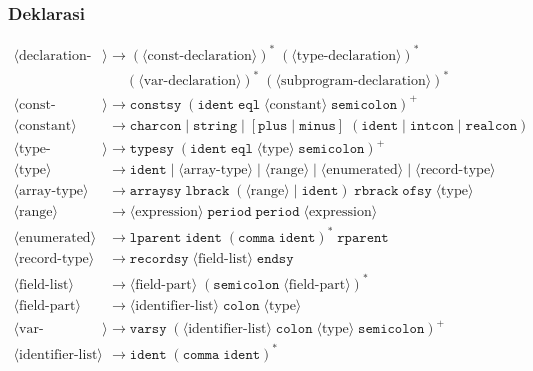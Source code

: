 \documentclass[12pt,a4paper]{article}
\begin{document}
\subsubsection{Deklarasi}
\begin{align*}
\langle \text{declaration-part} \rangle &\rightarrow ( \langle \text{const-declaration} \rangle )^* \; ( \langle \text{type-declaration} \rangle )^* \\
&\quad\; ( \langle \text{var-declaration} \rangle )^* \; ( \langle \text{subprogram-declaration} \rangle )^* \\
\langle \text{const-declaration} \rangle &\rightarrow \texttt{constsy} \; ( \texttt{ident} \; \texttt{eql} \; \langle \text{constant} \rangle \; \texttt{semicolon} )^+ \\
\langle \text{constant} \rangle &\rightarrow \texttt{charcon} \;|\; \texttt{string} \;|\; [ \texttt{plus} \;|\; \texttt{minus} ] \; ( \texttt{ident} \;|\; \texttt{intcon} \;|\; \texttt{realcon} ) \\
\langle \text{type-declaration} \rangle &\rightarrow \texttt{typesy} \; ( \texttt{ident} \; \texttt{eql} \; \langle \text{type} \rangle \; \texttt{semicolon} )^+ \\
\langle \text{type} \rangle &\rightarrow \texttt{ident} \;|\; \langle \text{array-type} \rangle \;|\; \langle \text{range} \rangle \;|\; \langle \text{enumerated} \rangle \;|\; \langle \text{record-type} \rangle \\
\langle \text{array-type} \rangle &\rightarrow \texttt{arraysy} \; \texttt{lbrack} \; ( \langle \text{range} \rangle \;|\; \texttt{ident} ) \; \texttt{rbrack} \; \texttt{ofsy} \; \langle \text{type} \rangle \\
\langle \text{range} \rangle &\rightarrow \langle \text{expression} \rangle \; \texttt{period} \; \texttt{period} \; \langle \text{expression} \rangle \\
\langle \text{enumerated} \rangle &\rightarrow \texttt{lparent} \; \texttt{ident} \; ( \texttt{comma} \; \texttt{ident} )^* \; \texttt{rparent} \\
\langle \text{record-type} \rangle &\rightarrow \texttt{recordsy} \; \langle \text{field-list} \rangle \; \texttt{endsy} \\
\langle \text{field-list} \rangle &\rightarrow \langle \text{field-part} \rangle \; ( \texttt{semicolon} \; \langle \text{field-part} \rangle )^* \\
\langle \text{field-part} \rangle &\rightarrow \langle \text{identifier-list} \rangle \; \texttt{colon} \; \langle \text{type} \rangle \\
\langle \text{var-declaration} \rangle &\rightarrow \texttt{varsy} \; ( \langle \text{identifier-list} \rangle \; \texttt{colon} \; \langle \text{type} \rangle \; \texttt{semicolon} )^+ \\
\langle \text{identifier-list} \rangle &\rightarrow \texttt{ident} \; ( \texttt{comma} \; \texttt{ident} )^*
\end{align*}
\end{document}
